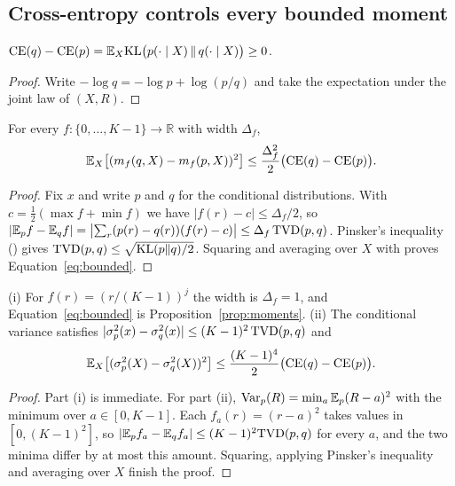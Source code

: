 \subsection{Cross-entropy controls every bounded moment}
\label{app:moments-ce}

\begin{lemma}
\label{lem:cekl}
$\mathrm{CE}(q)-\mathrm{CE}(p)=\mathbb{E}_X\mathrm{KL}\bigl(p(\cdot\mid X)\,\|\,q(\cdot\mid X)\bigr)\ge0$.
\end{lemma}

\begin{proof}
Write $-\log q=-\log p+\log(p/q)$ and take the expectation under the joint law of $(X,R)$.
\end{proof}

\begin{proposition}
\label{prop:bounded}
For every $f:\{0,\dots,K-1\}\to\mathbb R$ with width $\Delta_f$,
\begin{equation}
\mathbb{E}_X\bigl[(m_f(q,X)-m_f(p,X))^2\bigr]\le\frac{\Delta_f^2}{2}\bigl(\mathrm{CE}(q)-\mathrm{CE}(p)\bigr).
\label{eq:bounded}
\end{equation}
\end{proposition}

\begin{proof}
Fix $x$ and write $p$ and $q$ for the conditional distributions.
With $c=\tfrac12(\max f+\min f)$ we have $|f(r)-c|\le\Delta_f/2$, so $|\mathbb{E}_pf-\mathbb{E}_qf|=\bigl|\sum_r(p(r)-q(r))(f(r)-c)\bigr|\le\Delta_f\,\mathrm{TVD}(p,q)$.
Pinsker's inequality () gives $\mathrm{TVD}(p,q)\le\sqrt{\mathrm{KL}(p\|q)/2}$.
Squaring and averaging over $X$ with  proves Equation~\eqref{eq:bounded}.
\end{proof}

\begin{proposition}
\label{prop:variance}
(i) For $f(r)=(r/(K-1))^j$ the width is $\Delta_f=1$, and Equation~\eqref{eq:bounded} is Proposition~\ref{prop:moments}.
(ii) The conditional variance satisfies $|\sigma_p^2(x)-\sigma_q^2(x)|\le(K-1)^2\,\mathrm{TVD}(p,q)$ and
\[
\mathbb{E}_X\bigl[(\sigma_p^2(X)-\sigma_q^2(X))^2\bigr]\le\frac{(K-1)^4}{2}\bigl(\mathrm{CE}(q)-\mathrm{CE}(p)\bigr).
\]
\end{proposition}

\begin{proof}
Part (i) is immediate.
For part (ii), $\operatorname{Var}_p(R)=\min_a\mathbb{E}_p(R-a)^2$ with the minimum over $a\in[0,K-1]$.
Each $f_a(r)=(r-a)^2$ takes values in $[0,(K-1)^2]$, so $|\mathbb{E}_pf_a-\mathbb{E}_qf_a|\le(K-1)^2\mathrm{TVD}(p,q)$ for every $a$, and the two minima differ by at most this amount.
Squaring, applying Pinsker's inequality and averaging over $X$ finish the proof.
\end{proof}

